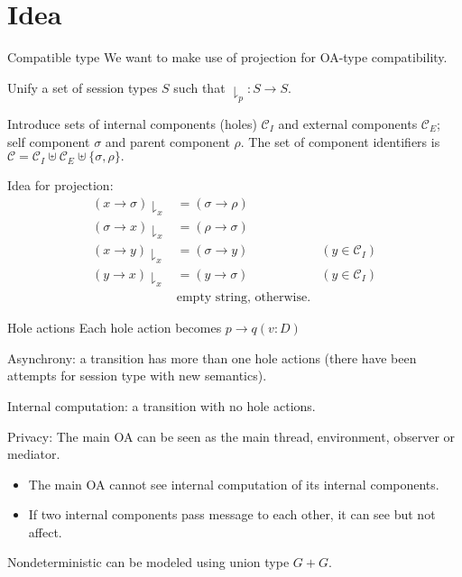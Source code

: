 \section{Idea}
\begin{frame}{Compatible type}
  We want to make use of projection for OA-type compatibility.

  Unify a set of session types $S$ such that $\downharpoonright_p : S\to S$.

  Introduce sets of internal components (holes) $\mathcal{C}_I$ and external components $\mathcal{C}_E$; self component $\sigma$ and parent component $\rho$. The set of component identifiers is $\mathcal{C} = \mathcal{C}_I \uplus \mathcal{C}_E \uplus \{\sigma, \rho\}.$

  Idea for projection:
  \begin{align*}
    (x\rightarrow \sigma)\downharpoonright_x  & = (\sigma\rightarrow\rho)                              \\
    (\sigma \rightarrow x)\downharpoonright_x & = (\rho\rightarrow\sigma)                              \\
    (x\rightarrow y)\downharpoonright_x       & = (\sigma\rightarrow y)         & (y\in \mathcal{C}_I) \\
    (y\rightarrow x)\downharpoonright_x       & = (y\rightarrow \sigma)         & (y\in \mathcal{C}_I) \\
                                              & \text{empty string, otherwise}.
  \end{align*}
\end{frame}

\begin{frame}{Hole actions}
  Each hole action becomes $p\rightarrow q (v : D)$

  Asynchrony: a transition has more than one hole actions (there have been attempts for session type with new semantics).

  Internal computation: a transition with no hole actions.

  Privacy: The main OA can be seen as the main thread, environment, observer or mediator.
  \begin{itemize}
    \item The main OA cannot see internal computation of its internal components.
    \item If two internal components pass message to each other, it can see but not affect.
  \end{itemize}

  Nondeterministic can be modeled using union type $G+G$.
\end{frame}

